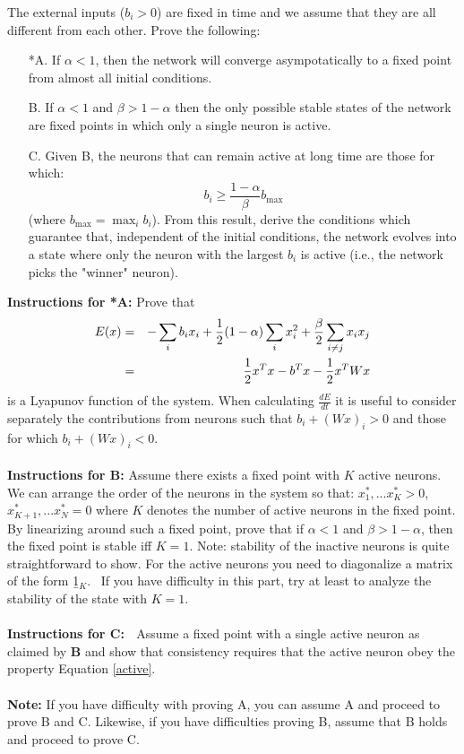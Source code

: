\documentclass{article}
\begin{document}
\bigskip The external inputs ($b_{i}>0$) are fixed in time and we assume
that they are all different from each other. Prove the following:

\begin{enumerate}
\item[*A.] If $\alpha <1$, then the network will converge asympotatically to
a fixed point from almost all initial conditions.

\item[B.] If $\alpha <1$ and $\beta >1-\alpha $ then the only possible
stable states of the network are fixed points in which only a single neuron
is active.

\item[C.] Given B, the neurons that can remain active at long time are those
for which:
\begin{equation}
b_{i}\geq \frac{1-\alpha }{\beta }b_{\max }  \label{active}
\end{equation}%
(where $b_{\max }=\max_{i}b_{i}$). From this result, derive the
conditions which guarantee that, independent of the initial
conditions, the network evolves into a state where only the neuron
with the largest $b_{i}$ is active (i.e., the network picks the
"winner" neuron).
\end{enumerate}
\bigskip
\textbf{Instructions for *A: }Prove that
\begin{eqnarray}
E(x) &=&-\sum_{i}b_{i}x_{i}+\frac{1}{2}(1-\alpha )\sum_{i}x_{i}^{2}+\frac{%
\beta }{2}\sum_{i\not=j}x_{i}x_{j}  \label{eqn:Lyapunov} \\
&=&\frac{1}{2}x^{T}x-b^{T}x-\frac{1}{2}x^{T}Wx
\end{eqnarray}%
is a Lyapunov function of the system. When calculating $\frac{dE}{dt}$ it is
useful to consider separately the contributions from neurons such that $%
b_{i}+(Wx)_{i}>0$ and those for which $b_{i}+(Wx)_{i}<0$.
\\
\\
\textbf{Instructions for B: }Assume there exists a fixed point with
$K$ active neurons. We can arrange the order of the neurons in the
system so that: $x_{1}^{\ast },...x_{K}^{\ast }>0$,  $x_{K+1}^{\ast
},...x_{N}^{\ast }=0$ where $K$ denotes the number of active neurons
in the fixed point$.$ By linearizing around such a fixed point, prove that if $%
\alpha <1$ and $\beta >1-\alpha $, then the fixed point is stable
iff $K=1$. Note: stability of the inactive neurons is quite
straightforward to show. For the active neurons you need to
diagonalize a matrix of the form \b{1}$_{K}$. \ If you have
difficulty in this part, try at least to analyze the stability of
the state with $K=1$.
\\
\\
\textbf{Instructions for C: \ }Assume a fixed point with a single active
neuron as claimed by \textbf{B }and show that consistency requires that the
active neuron obey the 
property Equation \ref{active}.
\\
\\
\textbf{Note: }If you have difficulty with proving A, you can assume A and 
proceed to prove B and C. Likewise, if you have difficulties proving B,
assume that  B holds and proceed to prove C.
\end{document}

